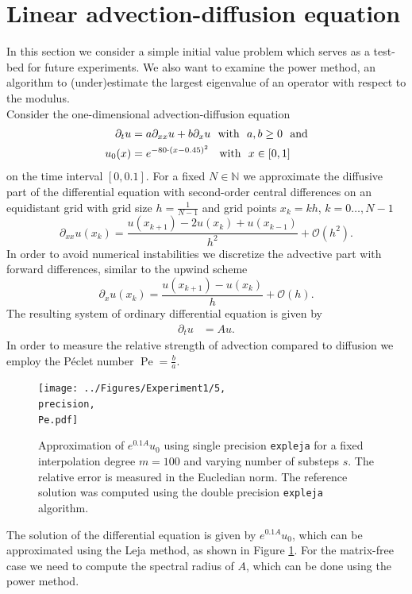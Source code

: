 \documentclass{scrartcl}
\begin{document}
	\section{Linear advection-diffusion equation}\label{sec:LinearADe}
	In this section we consider a simple initial value problem which serves as a test-bed for future experiments. We also want to examine the power method, an algorithm to (under)estimate the largest eigenvalue of an operator with respect to the modulus.\\
	Consider the one-dimensional advection-diffusion equation
	\begin{align}
	\begin{split}
	\partial_tu &= a\partial_{xx}u + b\partial_xu ~~\text{with}~~ a,b\ge 0 ~~\text{and}\\
	u_0(x) &= e^{-80\cdot(x-0.45)^2}\hphantom{,} ~~\text{with}~~ x\in[0,1]
	\end{split}\label{eq:LinearAdvDif}
	\end{align}
	on the time interval $[0,0.1]$. For a fixed $N\in\mathbb N$ we approximate the diffusive part of the differential equation with second-order central differences on an equidistant grid with grid size $h = \frac{1}{N-1}$ and grid points $x_k = kh$, $k=0\dots,N-1$
	\[\partial_{xx}u(x_k) = \frac{u(x_{k+1}) - 2u(x_k) + u(x_{k-1})}{{h}^2} + \mathcal{O}({h}^2).\]
	In order to avoid numerical instabilities we discretize the advective part with forward differences, similar to the upwind scheme
	\[\partial_{x}u(x_k) = \frac{u(x_{k+1}) - u(x_k)}{h} + \mathcal{O}(h).\]
	The resulting system of ordinary differential equation is given by
	\begin{align*}
	\partial_tu &= Au.
	\end{align*}
	In order to measure the relative strength of advection compared to diffusion we employ the P\'eclet number $\operatorname{Pe} = \frac{b}{a}$.
	\begin{figure}[ht]
		\newcommand{\precision}{single}
		\newcommand{\Pe}{Pe=10.0}
		\centering
		\texttt{[image: ../Figures/Experiment1/5, \\precision, \\Pe.pdf]}
		\caption{Approximation of $e^{0.1A}u_0$ using single precision \texttt{expleja} for a fixed interpolation degree $m=100$ and varying number of substeps $s$. The relative error is measured in the Eucledian norm. The reference solution was computed using the double precision \texttt{expleja} algorithm.}
		\label{fig:Experiment1}
	\end{figure} 
	\noindent The solution of the differential equation is given by $e^{0.1A}u_0$, which can be approximated using the Leja method, as shown in Figure \ref{fig:Experiment1}. For the matrix-free case we need to compute the spectral radius of $A$, which can be done using the power method.
	
\end{document}
